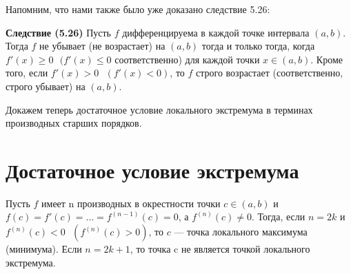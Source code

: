 	Напомним, что нами также было уже доказано следствие 5.26:
	
	\textbf{Следствие (5.26)} Пусть $f$ дифференцируема в каждой точке интервала $(a, b)$. Тогда $f$ не
	убывает (не возрастает) на $(a, b)$ тогда и только тогда, когда $f'(x) \geqslant 0 \text{ } (f'(x) \leqslant 0$ соответственно) для каждой точки $x \in (a, b)$. Кроме того, если $f'(x) > 0 \text{ } (f'(x) < 0)$, то $f$ строго возрастает (соответственно, строго убывает) на $(a, b)$.
	
	Докажем теперь достаточное условие локального экстремума в терминах производных старших порядков.
	
	\section{Достаточное условие экстремума}

	
	\begin{theorem}
		Пусть $f$ имеет n производных в окрестности точки $c \in (a, b)$ и $f(c) = f'(c) = ... = f^{(n - 1)}(c) = 0$, а $f^{(n)}(c) \neq 0$. Тогда, если $n = 2k$ и $f^{(n)}(c) < 0 \text{ } (f^{(n)}(c) > 0)$, то $c$ — точка локального максимума (минимума). Если $n = 2k + 1$, то точка c не является точкой локального экстремума.
	\end{theorem}
	
